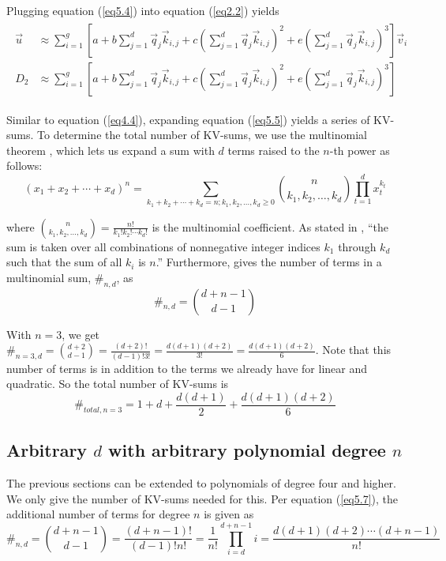 \documentclass{article}
\numberwithin{equation}{section} %
\def\q{\vec{q}}
\def\k{\vec{k}}
\def\v{\vec{v}}
\def\u{\vec{u}}
\begin{document}
Plugging equation (\ref{eq5.4}) into equation (\ref{eq2.2}) yields
\begin{align} \begin{split}
  \u  &\approx \sum_{i=1}^g \left[ a + b \sum_{j=1}^d \q_j \k_{i,j}
    + c \left( \sum_{j=1}^d \q_j \k_{i,j} \right)^2
    + e \left( \sum_{j=1}^d \q_j \k_{i,j} \right)^3 \right] \v_i \\
  D_2 &\approx \sum_{i=1}^g \left[ a + b \sum_{j=1}^d \q_j \k_{i,j}
    + c \left( \sum_{j=1}^d \q_j \k_{i,j} \right)^2
    + e \left( \sum_{j=1}^d \q_j \k_{i,j} \right)^3 \right]
\label{eq5.5} \end{split} \end{align}

Similar to equation (\ref{eq4.4}), expanding equation (\ref{eq5.5}) yields a series of KV-sums. To determine the total number of KV-sums, we use the multinomial theorem \citep{multinomial}, which lets us expand a sum with $d$ terms raised to the $n$-th power as follows:
\begin{equation}
  (x_1 + x_2 + \cdots + x_d)^n = \sum_{k_1 + k_2 + \cdots + k_d = n; k_1, k_2, \ldots, k_d \ge 0}
    \binom{n}{k_1, k_2, \ldots, k_d} \prod_{t=1}^d x_t^{k_t}
\label{eq5.6} \end{equation}

where $\binom{n}{k_1, k_2, \ldots, k_d} = \frac{n!}{k_1! k_2! \cdots k_d!}$ is the multinomial coefficient. As stated in \citep{multinomial}, “the sum is taken over all combinations of nonnegative integer indices $k_1$ through $k_d$ such that the sum of all $k_i$ is $n$.” Furthermore, \citep{multinomial} gives the number of terms in a multinomial sum, $\#_{n,d}$, as
\begin{equation}
  \#_{n,d} = \binom{d+n-1}{d-1}
\label{eq5.7} \end{equation}

With $n = 3$, we get $\#_{n=3, d} = \binom{d+2}{d-1} = \frac{(d+2)!}{(d-1)! 3!} = \frac{d(d+1)(d+2)}{3!} = \frac{d (d+1) (d+2)}{6}$.
Note that this number of terms is in addition to the terms we already have for linear and quadratic. So the total number of KV-sums is
\begin{equation}
  \#_{total, n=3} = 1 + d + \frac{d(d+1)}{2} + \frac{d(d+1)(d+2)}{6}
\label{eq5.8} \end{equation}

\subsection{Arbitrary $d$ with arbitrary polynomial degree $n$}
The previous sections can be extended to polynomials of degree four and higher. We only give the number of KV-sums needed for this. Per equation (\ref{eq5.7}), the additional number of terms for degree $n$ is given as
\begin{equation}
  \#_{n, d} = \binom{d+n-1}{d-1} = \frac{(d+n-1)!}{(d-1)! n!} = \frac{1}{n!} \prod_{i=d}^{d+n-1} i = \frac{d (d+1) (d+2) \cdots (d+n-1)}{n!}
\label{eq5.9} \end{equation}
\end{document}
